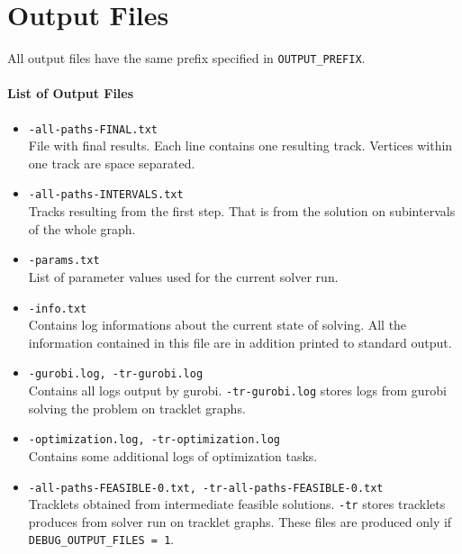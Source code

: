 \documentclass[a4paper,10pt]{article}
\begin{document}
\section{Output Files}
All output files have the same prefix specified in \texttt{OUTPUT\_PREFIX}. 
\paragraph{List of  Output Files}
\begin{itemize}
\item \texttt{-all-paths-FINAL.txt}\\
File with final results. Each line contains one resulting track. Vertices within one track are space separated.
\item \texttt{-all-paths-INTERVALS.txt}\\
Tracks resulting from the first step. That is from the solution on subintervals of the whole graph.
\item \texttt{-params.txt}\\
List of parameter values used for the current solver run.
\item \texttt{-info.txt}\\
Contains log informations about the current state of solving. All the information contained in this file are in addition printed to standard output.
\item \texttt{-gurobi.log, -tr-gurobi.log}\\
Contains all logs output by gurobi. \texttt{-tr-gurobi.log} stores logs from gurobi solving the problem on tracklet graphs.
\item \texttt{-optimization.log, -tr-optimization.log}\\
Contains some additional logs of optimization tasks. 
\item \texttt{-all-paths-FEASIBLE-0.txt, -tr-all-paths-FEASIBLE-0.txt}\\
Tracklets obtained from intermediate feasible solutions. \texttt{-tr} stores tracklets produces from solver run on tracklet graphs. These files are produced only if \texttt{DEBUG\_OUTPUT\_FILES = 1}.
\end{itemize}
\end{document}
